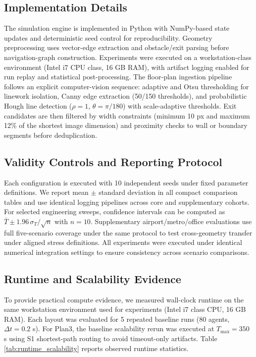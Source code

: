 \documentclass[nolineno]{ieeeaccess}
\begin{document}
\subsection{Implementation Details}
The simulation engine is implemented in Python with NumPy-based state updates and deterministic seed control for reproducibility. Geometry preprocessing uses vector-edge extraction and obstacle/exit parsing before navigation-graph construction. Experiments were executed on a workstation-class environment (Intel i7 CPU class, 16 GB RAM), with artifact logging enabled for run replay and statistical post-processing.
The floor-plan ingestion pipeline follows an explicit computer-vision sequence: adaptive and Otsu thresholding for linework isolation, Canny edge extraction (50/150 thresholds), and probabilistic Hough line detection ($\rho=1$, $\theta=\pi/180$) with scale-adaptive thresholds. Exit candidates are then filtered by width constraints (minimum 10 px and maximum 12\% of the shortest image dimension) and proximity checks to wall or boundary segments before deduplication.

\subsection{Validity Controls and Reporting Protocol}
Each configuration is executed with 10 independent seeds under fixed parameter definitions. We report mean $\pm$ standard deviation in all compact comparison tables and use identical logging pipelines across core and supplementary cohorts. For selected engineering sweeps, confidence intervals can be computed as $\bar{T} \pm 1.96\,\sigma_T/\sqrt{n}$ with $n=10$. Supplementary airport/metro/office evaluations use full five-scenario coverage under the same protocol to test cross-geometry transfer under aligned stress definitions.
All experiments were executed under identical numerical integration settings to ensure consistency across scenario comparisons.

\subsection{Runtime and Scalability Evidence}
To provide practical compute evidence, we measured wall-clock runtime on the same workstation environment used for experiments (Intel i7 class CPU, 16 GB RAM). Each layout was evaluated for 5 repeated baseline runs (80 agents, $\Delta t=0.2$ s). For Plan3, the baseline scalability rerun was executed at $T_{\max}=350$ s using S1 shortest-path routing to avoid timeout-only artifacts. Table \ref{tab:runtime_scalability} reports observed runtime statistics.
\end{document}
